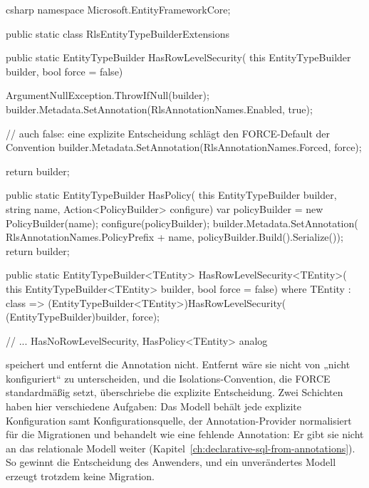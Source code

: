 \begin{sourcecode}{csharp}
namespace Microsoft.EntityFrameworkCore;

public static class RlsEntityTypeBuilderExtensions
{
    public static EntityTypeBuilder HasRowLevelSecurity(
        this EntityTypeBuilder builder, bool force = false)
    {
        ArgumentNullException.ThrowIfNull(builder);
        builder.Metadata.SetAnnotation(RlsAnnotationNames.Enabled, true);

        // auch false: eine explizite Entscheidung schlägt den FORCE-Default der Convention
        builder.Metadata.SetAnnotation(RlsAnnotationNames.Forced, force);

        return builder;
    }

    public static EntityTypeBuilder HasPolicy(
        this EntityTypeBuilder builder, string name, Action<PolicyBuilder> configure)
    {
        var policyBuilder = new PolicyBuilder(name);
        configure(policyBuilder);
        builder.Metadata.SetAnnotation(
            RlsAnnotationNames.PolicyPrefix + name, policyBuilder.Build().Serialize());
        return builder;
    }

    public static EntityTypeBuilder<TEntity> HasRowLevelSecurity<TEntity>(
        this EntityTypeBuilder<TEntity> builder, bool force = false) where TEntity : class
        => (EntityTypeBuilder<TEntity>)HasRowLevelSecurity(
            (EntityTypeBuilder)builder, force);

    // ... HasNoRowLevelSecurity, HasPolicy<TEntity> analog
}
\end{sourcecode}

speichert  und entfernt die Annotation nicht. Entfernt wäre sie nicht von „nicht
konfiguriert“ zu unterscheiden, und die Isolations-Convention, die FORCE standardmäßig setzt,
überschriebe die explizite Entscheidung. Zwei Schichten haben hier verschiedene Aufgaben: Das
Modell behält jede explizite Konfiguration samt Konfigurationsquelle, der Annotation-Provider
normalisiert für die Migrationen und behandelt  wie eine fehlende Annotation: Er
gibt sie nicht an das relationale Modell weiter (Kapitel~\ref{ch:declarative-sql-from-annotations}). So gewinnt die Entscheidung
des Anwenders, und ein unverändertes Modell erzeugt trotzdem keine Migration.

